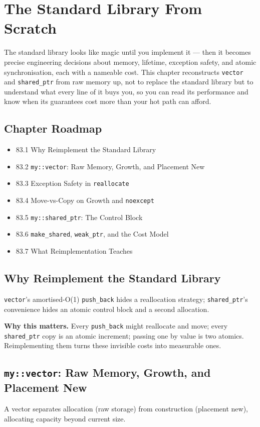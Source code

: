 \chapter{The Standard Library From Scratch}

The standard library looks like magic until you implement it --- then it becomes precise engineering decisions about memory, lifetime, exception safety, and atomic synchronisation, each with a nameable cost. This chapter reconstructs \texttt{vector} and \texttt{shared\_ptr} from raw memory up, not to replace the standard library but to understand what every line of it buys you, so you can read its performance and know when its guarantees cost more than your hot path can afford.

\section*{Chapter Roadmap}
\begin{itemize}
\item 83.1 Why Reimplement the Standard Library
\item 83.2 \texttt{my::vector}: Raw Memory, Growth, and Placement New
\item 83.3 Exception Safety in \texttt{reallocate}
\item 83.4 Move-vs-Copy on Growth and \texttt{noexcept}
\item 83.5 \texttt{my::shared\_ptr}: The Control Block
\item 83.6 \texttt{make\_shared}, \texttt{weak\_ptr}, and the Cost Model
\item 83.7 What Reimplementation Teaches
\end{itemize}

\section{Why Reimplement the Standard Library}
\texttt{vector}'s amortised-O(1) \texttt{push\_back} hides a reallocation strategy; \texttt{shared\_ptr}'s convenience hides an atomic control block and a second allocation.

\textbf{Why this matters.} Every \texttt{push\_back} might reallocate and move; every \texttt{shared\_ptr} copy is an atomic increment; passing one by value is two atomics. Reimplementing them turns these invisible costs into measurable ones.

\section{\texttt{my::vector}: Raw Memory, Growth, and Placement New}
A vector separates allocation (raw storage) from construction (placement new), allocating capacity beyond current size.

